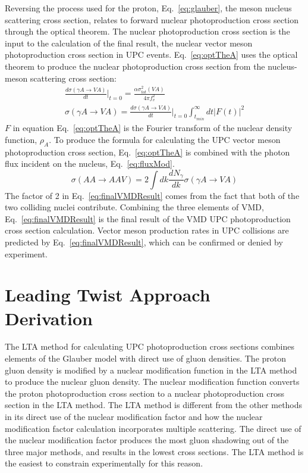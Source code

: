     Reversing the process used for the proton, Eq.~\ref{eq:glauber}, the meson 
      nucleus scattering cross section, relates to forward nuclear 
      photoproduction cross section through the optical theorem. 
    The nuclear photoproduction cross section is the input to the calculation 
      of the final result, the nuclear vector meson photoproduction cross 
      section in UPC events.  
    Eq.~\ref{eq:optTheA} uses the optical theorem to produce the nuclear 
      photoproduction cross section from the nucleus-meson scattering cross 
      section:
    \begin{eqnarray} \label{eq:optTheA}
      \frac{d\sigma(\gamma A\rightarrow VA)}{dt}\Big|_{t=0}=
      \frac{\alpha\sigma_{tot}^{2}(VA)}{4\pi f_{v}^{2}}\nonumber \\
      \sigma(\gamma A\rightarrow VA)=\frac{d\sigma(\gamma A\rightarrow VA)}{dt}
        \Big|_{t=0}\int_{t_{min}}^{\infty}dt|F(t)|^{2}
    \end{eqnarray}
    $F$ in equation Eq.~\ref{eq:optTheA} is the Fourier transform of the 
      nuclear density function, $\rho_{A}$.
    To produce the formula for calculating the UPC vector meson 
      photoproduction cross section, Eq.~\ref{eq:optTheA} is combined with the 
      photon flux incident on the nucleus, Eq.~\ref{eq:fluxMod}. 
    \begin{equation} \label{eq:finalVMDResult}
      \sigma(AA\rightarrow AAV)=2\int{dk\frac{dN_{\gamma}}{dk}
                    \sigma(\gamma A\rightarrow VA)}
    \end{equation}
    The factor of 2 in Eq.~\ref{eq:finalVMDResult} comes from the fact that both 
      of the two colliding nuclei contribute. 
    Combining the three elements of VMD, Eq.~\ref{eq:finalVMDResult} is the 
      final result of the VMD UPC photoproduction cross section calculation. 
    Vector meson production rates in UPC collisions are predicted 
      by Eq.~\ref{eq:finalVMDResult}, which can be confirmed or denied by 
      experiment. 


  \section{\label{sec:ltaTheory}Leading Twist Approach Derivation}
    The LTA method for calculating UPC photoproduction cross sections
      combines elements of the Glauber model with direct use of gluon 
      densities. 
    The proton gluon density is modified by a nuclear modification 
      function in the LTA method to produce the nuclear gluon density. 
    The nuclear modification function converts the proton photoproduction
      cross section to a nuclear photoproduction cross section in the LTA 
      method.
    The LTA method is different from the other methods in its direct use of the
       nuclear modification factor and how the nuclear modification factor
       calculation incorporates multiple scattering.
    The direct use of the nuclear modification factor produces the most gluon 
      shadowing out of the three major methods, and results in the lowest
      cross sections.
    The LTA method is the easiest to constrain experimentally for this reason. 

